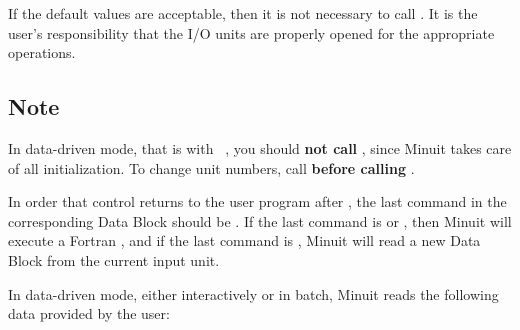 
If the default values are acceptable, then it is not necessary to
call .
It is the user's responsibility that the I/O units are properly
opened for the appropriate operations.
 
\subsection*{Note}
 
In data-driven mode, that is with ~, you should
{\bf not call }, since Minuit takes care of all
initialization. 
To change unit numbers, call  
{\bf before calling }.
 
In order that control returns to the user program after
, the last command in the corresponding Data Block
should be .  
If the last command is  or ,
then Minuit will execute a Fortran , and if the last
command is , Minuit will read a new Data Block from the current
input unit.
 
 
In data-driven mode, either interactively or in batch,
Minuit reads the following data provided by the user:

